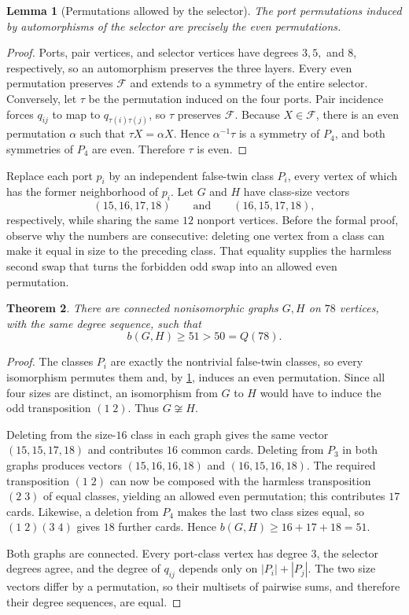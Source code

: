 \documentclass[11pt]{article}
\newtheorem{theorem}{Theorem}[section]
\newtheorem{lemma}[theorem]{Lemma}
\begin{document}
\begin{lemma}[Permutations allowed by the selector]\label{lem:A4}
The port permutations induced by automorphisms of the selector are precisely the even permutations.
\end{lemma}
\begin{proof}
Ports, pair vertices, and selector vertices have degrees $3,5,$ and $8$, respectively, so an
automorphism preserves the three layers. Every even permutation preserves $\mathcal F$ and extends to
a symmetry of the entire selector. Conversely, let $\tau$ be the permutation induced on the four
ports. Pair incidence forces $q_{ij}$ to map to $q_{\tau(i)\tau(j)}$, so $\tau$ preserves $\mathcal F$.
Because $X\in\mathcal F$, there is an even permutation $\alpha$ such that $\tau X=\alpha X$. Hence
$\alpha^{-1}\tau$ is a symmetry of $P_4$, and both symmetries of $P_4$ are even. Therefore $\tau$ is
even.
\end{proof}

Replace each port $p_i$ by an independent false-twin class $P_i$, every vertex of which has the former
neighborhood of $p_i$. Let $G$ and $H$ have class-size vectors
\[
 (15,16,17,18)\qquad\text{and}\qquad(16,15,17,18),
\]
respectively, while sharing the same $12$ nonport vertices. Before the formal proof, observe why the
numbers are consecutive: deleting one vertex from a class can make it equal in size to the preceding
class. That equality supplies the harmless second swap that turns the forbidden odd swap into an
allowed even permutation.

\begin{theorem}\label{thm:78}
There are connected nonisomorphic graphs $G,H$ on $78$ vertices, with the same degree sequence, such that
\[
 b(G,H)\ge51>50=Q(78).
\]
\end{theorem}
\begin{proof}
The classes $P_i$ are exactly the nontrivial false-twin classes, so every isomorphism permutes them and,
by \cref{lem:A4}, induces an even permutation. Since all four sizes are distinct, an isomorphism from
$G$ to $H$ would have to induce the odd transposition $(1\;2)$. Thus $G\not\cong H$.

Deleting from the size-$16$ class in each graph gives the same vector $(15,15,17,18)$ and contributes
$16$ common cards. Deleting from $P_3$ in both graphs produces vectors $(15,16,16,18)$ and
$(16,15,16,18)$. The required transposition $(1\;2)$ can now be composed with the harmless transposition
$(2\;3)$ of equal classes, yielding an allowed even permutation; this contributes $17$ cards. Likewise,
a deletion from $P_4$ makes the last two class sizes equal, so $(1\;2)(3\;4)$ gives $18$ further cards.
Hence $b(G,H)\ge16+17+18=51$.

Both graphs are connected. Every port-class vertex has degree $3$, the selector degrees agree, and the
degree of $q_{ij}$ depends only on $|P_i|+|P_j|$. The two size vectors differ by a permutation, so their
multisets of pairwise sums, and therefore their degree sequences, are equal.
\end{proof}
\end{document}
